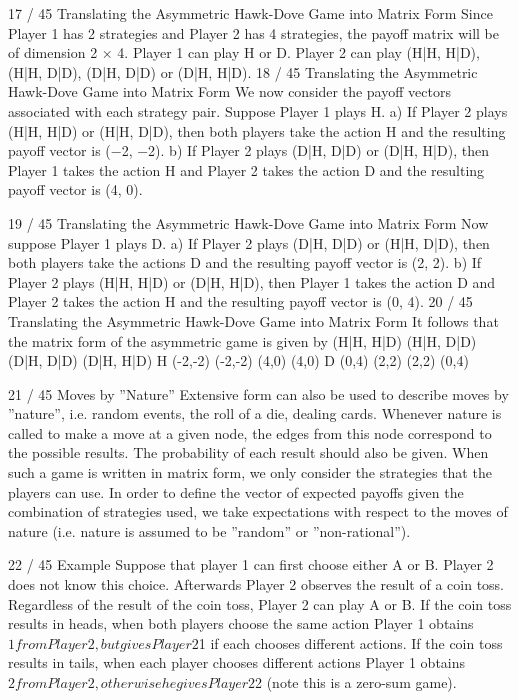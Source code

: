 17 / 45
Translating the Asymmetric Hawk-Dove Game into Matrix
Form
Since Player 1 has 2 strategies and Player 2 has 4 strategies, the
payoff matrix will be of dimension 2 × 4.
Player 1 can play H or D.
Player 2 can play (H|H, H|D), (H|H, D|D), (D|H, D|D) or
(D|H, H|D).
18 / 45
Translating the Asymmetric Hawk-Dove Game into Matrix
Form
We now consider the payoff vectors associated with each strategy
pair.
Suppose Player 1 plays H.
a) If Player 2 plays (H|H, H|D) or (H|H, D|D), then both players
take the action H and the resulting payoff vector is (−2, −2).
b) If Player 2 plays (D|H, D|D) or (D|H, H|D), then Player 1
takes the action H and Player 2 takes the action D and the
resulting payoff vector is (4, 0).

19 / 45
Translating the Asymmetric Hawk-Dove Game into Matrix
Form
Now suppose Player 1 plays D.
a) If Player 2 plays (D|H, D|D) or (H|H, D|D), then both players
take the actions D and the resulting payoff vector is (2, 2).
b) If Player 2 plays (H|H, H|D) or (D|H, H|D), then Player 1 takes
the action D and Player 2 takes the action H and the resulting
payoff vector is (0, 4).
20 / 45
Translating the Asymmetric Hawk-Dove Game into Matrix
Form
It follows that the matrix form of the asymmetric game is given by
(H|H, H|D) (H|H, D|D) (D|H, D|D) (D|H, H|D)
H (-2,-2) (-2,-2) (4,0) (4,0)
D (0,4) (2,2) (2,2) (0,4)

21 / 45
Moves by ”Nature”
Extensive form can also be used to describe moves by ”nature”,
i.e. random events, the roll of a die, dealing cards.
Whenever nature is called to make a move at a given node, the
edges from this node correspond to the possible results. The
probability of each result should also be given.
When such a game is written in matrix form, we only consider the
strategies that the players can use. In order to define the vector of
expected payoffs given the combination of strategies used, we
take expectations with respect to the moves of nature (i.e. nature
is assumed to be ”random” or ”non-rational”).

22 / 45
Example
Suppose that player 1 can first choose either A or B. Player 2 does
not know this choice.
Afterwards Player 2 observes the result of a coin toss. Regardless
of the result of the coin toss, Player 2 can play A or B.
If the coin toss results in heads, when both players choose the
same action Player 1 obtains $1 from Player 2, but gives Player 2
$1 if each chooses different actions. If the coin toss results in tails,
when each player chooses different actions Player 1 obtains $2
from Player 2, otherwise he gives Player 2 $2 (note this is a
zero-sum game).

